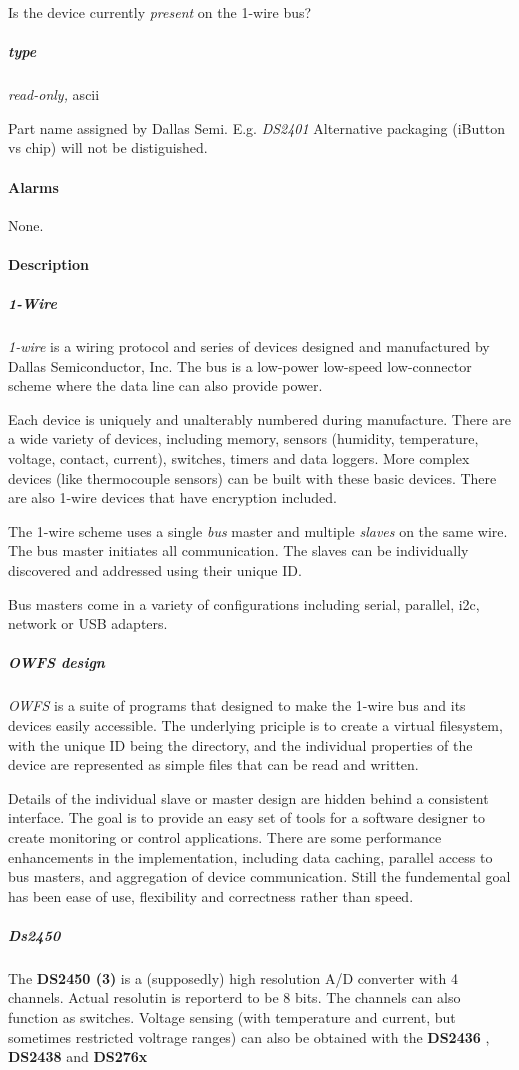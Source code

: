 Is the device currently \textit{present} on the 1-wire bus? 
\subparagraph*{type}\textit{read-only,} ascii 

Part name assigned by Dallas Semi. E.g. \textit{DS2401} Alternative packaging (iButton
vs chip) will not be distiguished.  
\paragraph*{Alarms}
None. 
\paragraph*{Description}
          
\subparagraph*{1-Wire}\textit{1-wire}
 is a wiring protocol and series of devices designed and manufactured by
Dallas Semiconductor, Inc. The bus is a low-power low-speed low-connector scheme
where the data line can also provide power. 

Each device is uniquely and
unalterably numbered during manufacture. There are a wide variety of devices,
including memory, sensors (humidity, temperature, voltage, contact, current),
switches, timers and data loggers. More complex devices (like thermocouple
sensors) can be built with these basic devices. There are also 1-wire devices
that have encryption included. 

The 1-wire scheme uses a single  \textit{bus} master
and multiple \textit{slaves} on the same wire. The bus master initiates all communication.
The slaves can be  individually discovered and addressed using their unique
ID. 

Bus masters come in a variety of configurations including serial, parallel,
i2c, network or USB adapters. 
\subparagraph*{OWFS design}\textit{OWFS} is a suite of programs that
designed to make the 1-wire bus and its devices easily accessible. The underlying
priciple is to create a virtual filesystem, with the unique ID being the
directory, and the individual properties of the device are represented
as simple files that can be read and written. 

Details of the individual
slave or master design are hidden behind a consistent interface. The goal
is to  provide an easy set of tools for a software designer to create monitoring
or control applications. There  are some performance enhancements in the
implementation, including data caching, parallel access to bus  masters,
and aggregation of device communication. Still the fundemental goal has
been ease of use, flexibility  and correctness rather than speed.  
\subparagraph*{Ds2450}The
\textsf{\textbf{DS2450 (3)}} is a (supposedly) high resolution A/D converter with 4 channels.
Actual resolutin is reporterd to be 8 bits. The channels can also function
as switches. Voltage sensing (with temperature and current, but sometimes
restricted voltrage ranges) can also be obtained with the \textbf{DS2436} , \textbf{DS2438}
and \textbf{DS276x} 
